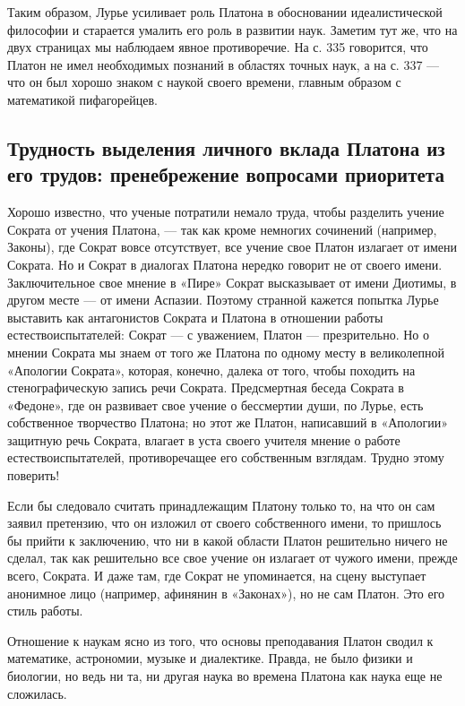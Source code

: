 Таким   образом,   Лурье   усиливает  роль   Платона   в   обосновании
идеалистической  философии и  старается  умалить его  роль в  развитии
наук.  Заметим  тут же,  что  на  двух  страницах мы  наблюдаем  явное
противоречие.  На с.  335 говорится,  что Платон  не имел  необходимых
познаний  в  областях  точных  наук,  а  на с.  337  ---  что  он  был
хорошо знаком с  наукой своего времени, главным  образом с математикой
пифагорейцев.

\subsection{Трудность выделения личного вклада  Платона из его трудов:
пренебрежение вопросами приоритета}

Хорошо известно,  что ученые  потратили немало труда,  чтобы разделить
учение Сократа от учения Платона, --- так как кроме немногих сочинений
(например,  Законы), где  Сократ  вовсе отсутствует,  все учение  свое
Платон  излагает от  имени Сократа.  Но  и Сократ  в диалогах  Платона
нередко  говорит не  от  своего имени.  Заключительное  свое мнение  в
«Пире»  Сократ высказывает  от имени  Диотимы, в  другом месте  --- от
имени Аспазии.  Поэтому странной  кажется попытка Лурье  выставить как
антагонистов Сократа и Платона в отношении работы естествоиспытателей:
Сократ --- с  уважением, Платон --- презрительно. Но  о мнении Сократа
мы знаем от  того же Платона по одному месту  в великолепной «Апологии
Сократа»,  которая,  конечно,  далека   от  того,  чтобы  походить  на
стенографическую запись  речи Сократа.  Предсмертная беседа  Сократа в
«Федоне», где  он развивает свое  учение о бессмертии души,  по Лурье,
есть собственное творчество  Платона; но этот же  Платон, написавший в
«Апологии» защитную речь Сократа, влагает в уста своего учителя мнение
о работе естествоиспытателей, противоречащее его собственным взглядам.
Трудно этому поверить!

Если бы следовало  считать принадлежащим Платону только то,  на что он
сам заявил претензию, что он  изложил от своего собственного имени, то
пришлось  бы  прийти к  заключению,  что  ни  в какой  области  Платон
решительно ничего  не сделал,  так как решительно  все свое  учение он
излагает  от чужого  имени, прежде  всего,  Сократа. И  даже там,  где
Сократ не  упоминается, на  сцену выступает анонимное  лицо (например,
афинянин в «Законах»), но не сам Платон. Это его стиль работы.

Отношение к наукам ясно из того, что основы преподавания Платон сводил
к математике, астрономии, музыке и  диалектике. Правда, не было физики
и биологии,  но ведь  ни та,  ни другая наука  во времена  Платона как
наука еще не сложилась.

